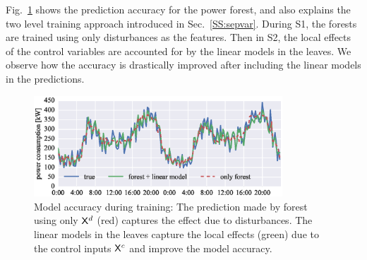 Fig.~\ref{F:sepvars} shows the prediction accuracy for the power forest, and also explains the two level training approach introduced in Sec.~\ref{SS:sepvar}. During S1, the forests are trained using only disturbances as the features. Then in S2, the local effects of the control variables are accounted for by the linear models in the leaves. We observe how the accuracy is drastically improved after including the linear models in the predictions.

\begin{figure}[h!]
	\centering
	\hspace{-0.3cm}\includegraphics[width=22pc]{figures/eplus_validation.eps}	
	\caption{Model accuracy during training: The prediction made by forest using only $\mathsf{X}^d$ (red) captures the effect due to disturbances. The linear models in the leaves capture the local effects (green) due to the control inputs $\mathsf{X}^c$ and improve the model accuracy.}
	\label{F:sepvars}
	\captionsetup{justification=centering}
\end{figure}

